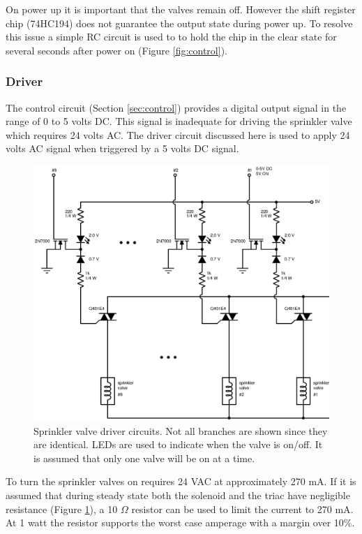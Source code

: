 \documentclass{article}
\begin{document}
On power up it is important that the valves remain off.
However the shift register chip (74HC194) does not guarantee
the output state during power up.
To resolve this issue a simple RC circuit is used to to hold the
chip in the clear state for several seconds after power
on (Figure \ref{fig:control}).


\FloatBarrier
\subsubsection{Driver}
\label{sec:driver}

The control circuit (Section \ref{sec:control}) provides a digital
output signal in the range of 0 to 5 volts DC.
This signal is inadequate for driving the sprinkler valve which
requires 24 volts AC.
The driver circuit discussed here is used to apply 24 volts AC
signal when triggered by a 5 volts DC signal.

\begin{figure}[hbp]
\centering
\includegraphics[scale=0.7]{xcircuit/driver_mult}
\caption{Sprinkler valve driver circuits.
Not all branches are shown since they are identical.
LEDs are used to indicate when the valve is on/off.
It is assumed that only one valve will be on at a time.}\label{fig:driver}
\end{figure}

To turn the sprinkler valves on requires 24 VAC at approximately 270 mA.
If it is assumed that during steady state both the solenoid
and the triac have negligible resistance (Figure \ref{fig:driver}),
a 10 $\Omega$ resistor can be used to limit the current to 270 mA.
At 1 watt the resistor supports the worst case amperage with a margin
over 10\%.
\end{document}
